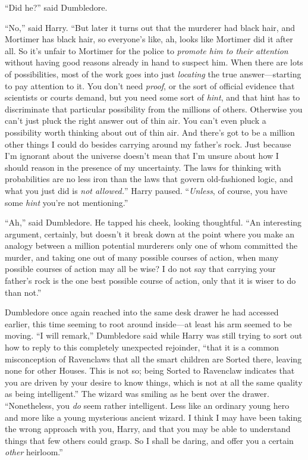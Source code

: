 “Did he?” said Dumbledore.

“No,” said Harry. “But later it turns out that the murderer had black hair, and Mortimer has black hair, so everyone’s like, ah, looks like Mortimer did it after all. So it’s unfair to Mortimer for the police to \emph{promote him to their attention} without having good reasons already in hand to suspect him. When there are lots of possibilities, most of the work goes into just \emph{locating} the true answer—starting to pay attention to it. You don’t need \emph{proof}, or the sort of official evidence that scientists or courts demand, but you need some sort of \emph{hint}, and that hint has to discriminate that particular possibility from the millions of others. Otherwise you can’t just pluck the right answer out of thin air. You can’t even pluck a possibility worth thinking about out of thin air. And there’s got to be a million other things I could do besides carrying around my father’s rock. Just because I’m ignorant about the universe doesn’t mean that I’m unsure about how I should reason in the presence of my uncertainty. The laws for thinking with probabilities are no less iron than the laws that govern old-fashioned logic, and what you just did is \emph{not allowed.}” Harry paused. “\emph{Unless}, of course, you have some \emph{hint} you’re not mentioning.”

“Ah,” said Dumbledore. He tapped his cheek, looking thoughtful. “An interesting argument, certainly, but doesn’t it break down at the point where you make an analogy between a million potential murderers only one of whom committed the murder, and taking one out of many possible courses of action, when many possible courses of action may all be wise? I do not say that carrying your father’s rock is the one best possible course of action, only that it is wiser to do than not.”

Dumbledore once again reached into the same desk drawer he had accessed earlier, this time seeming to root around inside—at least his arm seemed to be moving. “I will remark,” Dumbledore said while Harry was still trying to sort out how to reply to this completely unexpected rejoinder, “that it is a common misconception of Ravenclaws that all the smart children are Sorted there, leaving none for other Houses. This is not so; being Sorted to Ravenclaw indicates that you are driven by your desire to know things, which is not at all the same quality as being intelligent.” The wizard was smiling as he bent over the drawer. “Nonetheless, you \emph{do} seem rather intelligent. Less like an ordinary young hero and more like a young mysterious ancient wizard. I think I may have been taking the wrong approach with you, Harry, and that you may be able to understand things that few others could grasp. So I shall be daring, and offer you a certain \emph{other} heirloom.”

